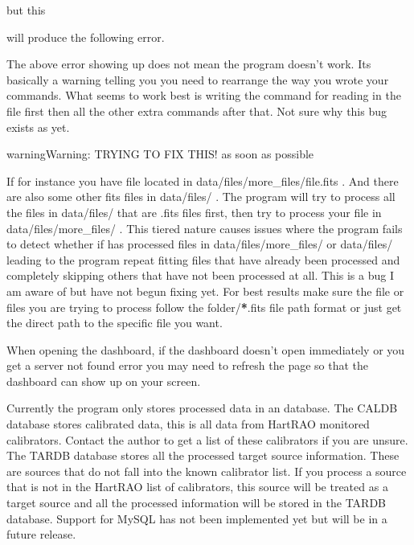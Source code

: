 \documentclass[letterpaper,10pt,english]{sphinxmanual}
\begin{document}
\sphinxAtStartPar
but this

\sphinxAtStartPar
will produce the following error.

\sphinxAtStartPar
The above error showing up does not mean the program doesn’t work. Its basically a warning
telling you you need to rearrange the way you wrote your commands. What seems to work best is
writing the command for reading in the file first then all the other extra commands after that.
Not sure why this bug exists as yet.

\sphinxAtStartPar
{}

\begin{sphinxadmonition}{warning}{Warning:}
\sphinxAtStartPar
TRYING TO FIX THIS! as soon as possible
\end{sphinxadmonition}

\sphinxAtStartPar
If for instance you have file located in data/files/more\_files/file.fits . And there are
also some other fits files in data/files/ . The program will try to process all the files
in data/files/ that are .fits files first, then try to process your file in data/files/more\_files/ .
This tiered nature causes issues where the program fails to detect whether if has processed files
in data/files/more\_files/ or data/files/ leading to the program repeat fitting files that have
already been processed and completely skipping others that have not been processed at all.
This is a bug I am aware of but have not begun fixing yet. For best results make sure the file
or files you are trying to process follow the folder/{\color{red}\bfseries{}*}.fits file path format or just get the direct path
to the specific file you want.

\sphinxAtStartPar
{}

\sphinxAtStartPar
When opening the dashboard, if the dashboard doesn’t open immediately
or you get a server not found error you may need to refresh the page
so that the dashboard can show up on your screen.

\sphinxAtStartPar
{}

\sphinxAtStartPar
Currently the program only stores processed data in an  database.
The CALDB database stores calibrated data, this is all data from HartRAO monitored calibrators. Contact the author
to get a list of these calibrators if you are unsure. The TARDB database stores all the processed target source
information. These are sources that do not fall into the known calibrator list. If you process a source that is
not in the HartRAO list of calibrators, this source will be treated as a target source and all the processed
information will be stored in the TARDB database. Support for MySQL has not been implemented yet but will be
in a future release.
\end{document}
